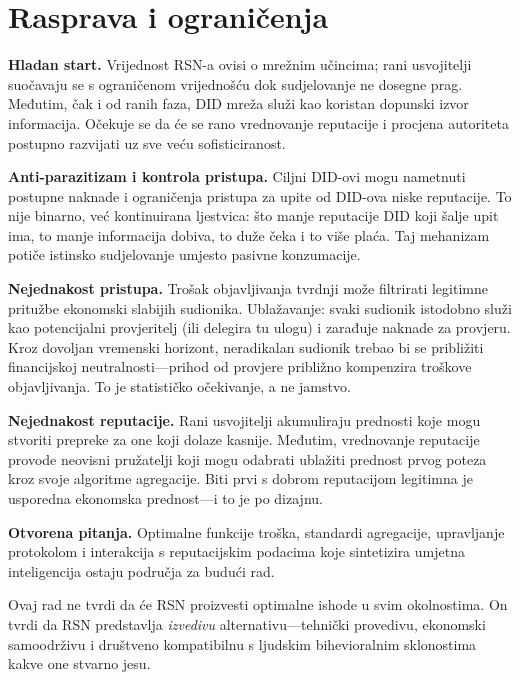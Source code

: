 \documentclass[11pt,a4paper,twocolumn]{article}
\begin{document}
\section{Rasprava i ograničenja}

\textbf{Hladan start.} Vrijednost RSN-a ovisi o mrežnim učincima; rani usvojitelji suočavaju se s ograničenom vrijednošću dok sudjelovanje ne dosegne prag. Međutim, čak i od ranih faza, DID mreža služi kao koristan dopunski izvor informacija. Očekuje se da će se rano vrednovanje reputacije i procjena autoriteta postupno razvijati uz sve veću sofisticiranost.

\textbf{Anti-parazitizam i kontrola pristupa.} Ciljni DID-ovi mogu nametnuti postupne naknade i ograničenja pristupa za upite od DID-ova niske reputacije. To nije binarno, već kontinuirana ljestvica: što manje reputacije DID koji šalje upit ima, to manje informacija dobiva, to duže čeka i to više plaća. Taj mehanizam potiče istinsko sudjelovanje umjesto pasivne konzumacije.

\textbf{Nejednakost pristupa.} Trošak objavljivanja tvrdnji može filtrirati legitimne pritužbe ekonomski slabijih sudionika. Ublažavanje: svaki sudionik istodobno služi kao potencijalni provjeritelj (ili delegira tu ulogu) i zarađuje naknade za provjeru. Kroz dovoljan vremenski horizont, neradikalan sudionik trebao bi se približiti financijskoj neutralnosti---prihod od provjere približno kompenzira troškove objavljivanja. To je statističko očekivanje, a ne jamstvo.

\textbf{Nejednakost reputacije.} Rani usvojitelji akumuliraju prednosti koje mogu stvoriti prepreke za one koji dolaze kasnije. Međutim, vrednovanje reputacije provode neovisni pružatelji koji mogu odabrati ublažiti prednost prvog poteza kroz svoje algoritme agregacije. Biti prvi s dobrom reputacijom legitimna je usporedna ekonomska prednost---i to je po dizajnu.

\textbf{Otvorena pitanja.} Optimalne funkcije troška, standardi agregacije, upravljanje protokolom i interakcija s reputacijskim podacima koje sintetizira umjetna inteligencija ostaju područja za budući rad.

Ovaj rad ne tvrdi da će RSN proizvesti optimalne ishode u svim okolnostima. On tvrdi da RSN predstavlja \emph{izvedivu} alternativu---tehnički provedivu, ekonomski samoodrživu i društveno kompatibilnu s ljudskim bihevioralnim sklonostima kakve one stvarno jesu.
\end{document}
